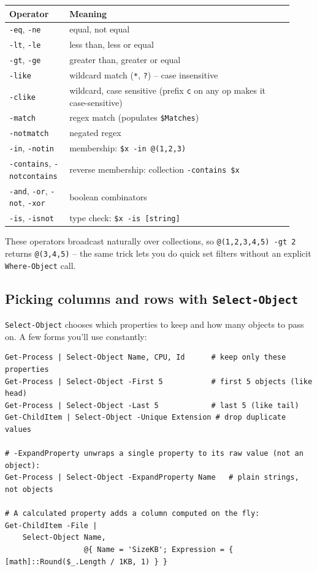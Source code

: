\documentclass[11pt,a4paper]{article}
\newcommand{\cmd}[1]{\texttt{\textcolor{pwshKw}{#1}}}
\begin{document}
\begin{center}
\renewcommand{\arraystretch}{1.1}
\begin{tabular}{p{0.18\linewidth} p{0.74\linewidth}}
\toprule
\textbf{Operator} & \textbf{Meaning} \\
\midrule
\texttt{-eq}, \texttt{-ne}            & equal, not equal \\
\texttt{-lt}, \texttt{-le}            & less than, less or equal \\
\texttt{-gt}, \texttt{-ge}            & greater than, greater or equal \\
\texttt{-like}                        & wildcard match (\texttt{*}, \texttt{?}) -- case insensitive \\
\texttt{-clike}                       & wildcard, case sensitive (prefix \texttt{c} on any op makes it case-sensitive) \\
\texttt{-match}                       & regex match (populates \texttt{\$Matches}) \\
\texttt{-notmatch}                    & negated regex \\
\texttt{-in}, \texttt{-notin}          & membership: \texttt{\$x -in @(1,2,3)} \\
\texttt{-contains}, \texttt{-notcontains} & reverse membership: collection \texttt{-contains \$x} \\
\texttt{-and}, \texttt{-or}, \texttt{-not}, \texttt{-xor} & boolean combinators \\
\texttt{-is}, \texttt{-isnot}          & type check: \texttt{\$x -is [string]} \\
\bottomrule
\end{tabular}
\end{center}

These operators broadcast naturally over collections, so
\texttt{@(1,2,3,4,5) -gt 2} returns \texttt{@(3,4,5)} -- the same
trick lets you do quick set filters without an explicit
\cmd{Where-Object} call.

\subsection*{Picking columns and rows with \texttt{Select-Object}}

\cmd{Select-Object} chooses which properties to keep and how many
objects to pass on. A few forms you'll use constantly:

\begin{lstlisting}[style=pwshstyle]
Get-Process | Select-Object Name, CPU, Id      # keep only these properties
Get-Process | Select-Object -First 5           # first 5 objects (like head)
Get-Process | Select-Object -Last 5            # last 5 (like tail)
Get-ChildItem | Select-Object -Unique Extension # drop duplicate values

# -ExpandProperty unwraps a single property to its raw value (not an object):
Get-Process | Select-Object -ExpandProperty Name   # plain strings, not objects

# A calculated property adds a column computed on the fly:
Get-ChildItem -File |
    Select-Object Name,
                  @{ Name = 'SizeKB'; Expression = { [math]::Round($_.Length / 1KB, 1) } }
\end{lstlisting}
\end{document}
